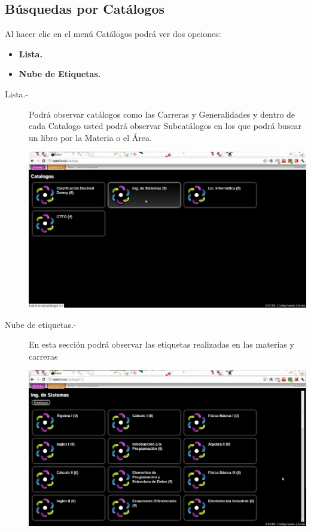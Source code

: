 \documentclass[12pt,letterpaper,oneside]{book}
\begin{document}
\subsection{Búsquedas por Catálogos}
Al hacer clic en el menú Catálogos podrá ver dos opciones:
\begin{itemize}
\item {\bf Lista.}
\item {\bf Nube de Etiquetas.}
\end{itemize}
\begin{description}
\item[Lista.-] Podrá observar catálogos como las Carreras y Generalidades y dentro de cada Catalogo  usted podrá observar Subcatálogos en los que podrá buscar un libro por la Materia o el Área.
\begin{center}
\includegraphics[scale=0.32]{img/4.png}
\end{center}
\item[Nube de etiquetas.-] En esta sección podrá observar las etiquetas realizadas en las materias y carreras
\begin{center}
\includegraphics[scale=0.32]{img/5.png}
\end{center}
\end{description}
\end{document}
